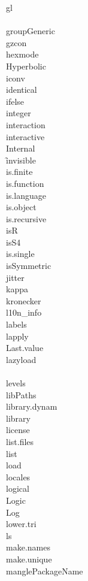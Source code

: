 \documentclass[12pt]{article}
\begin{document}
{gl} \\
 \\
{groupGeneric} \\
{gzcon} \\
{hexmode} \\
{Hyperbolic} \\
{iconv} \\
{identical} \\
{ifelse} \\
{integer} \\
{interaction} \\
{interactive} \\
{Internal} \\
\f{invisible} \\
{is.finite} \\
{is.function} \\
{is.language} \\
{is.object} \\
{is.recursive} \\
{isR} \\
{isS4} \\
{is.single} \\
{isSymmetric} \\
{jitter} \\
{kappa} \\
{kronecker} \\
{l10n\_info} \\
{labels} \\
{lapply} \\
{Last.value} \\
{lazyload} \\
 \\
{levels} \\
{libPaths} \\
{library.dynam} \\
{library} \\
{license} \\
{list.files} \\
{list} \\
{load} \\
{locales} \\
{logical} \\
{Logic} \\
{Log} \\
{lower.tri} \\
{ls} \\
{make.names} \\
{make.unique} \\
{manglePackageName} \\
\end{document}
